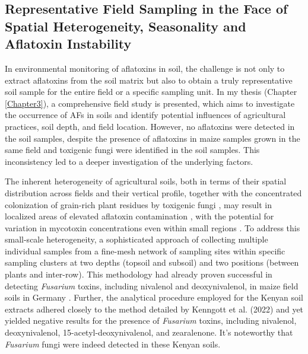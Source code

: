 \subsection{Representative Field Sampling in the Face of Spatial Heterogeneity, Seasonality and Aflatoxin Instability} 

In environmental monitoring of aflatoxins in soil, the challenge is not only to extract aflatoxins from the soil matrix but also to obtain a truly representative soil sample for the entire field or a specific sampling unit. In my thesis (Chapter \ref{Chapter3}), a comprehensive field study is presented, which aims to investigate the occurrence of AFs in soils and identify potential influences of agricultural practices, soil depth, and field location. However, no aflatoxins were detected in the soil samples, despite the presence of aflatoxins in maize samples grown in the same field and toxigenic fungi were identified in the soil samples. This inconsistency led to a deeper investigation of the underlying factors. 


The inherent heterogeneity of agricultural soils, both in terms of their spatial distribution across fields and their vertical profile, together with the concentrated colonization of grain-rich plant residues by toxigenic fungi \citep{horn2003ecology}, may result in localized areas of elevated aflatoxin contamination \citep{accinelli2008aspergillus}, with the potential for variation in mycotoxin concentrations even within small regions \citep{kenngott2022fusarium}. To address this small-scale heterogeneity, a sophisticated approach of collecting multiple individual samples from a fine-mesh network of sampling sites within specific sampling clusters at two depths (topsoil and subsoil) and two positions (between plants and inter-row). This methodology had already proven successful in detecting \textit{Fusarium} toxins, including nivalenol and deoxynivalenol, in maize field soils in Germany \citep{kenngott2022fusarium}. Further, the analytical procedure employed for the Kenyan soil extracts adhered closely to the method detailed by Kenngott et al. (2022) and yet yielded negative results for the presence of \textit{Fusarium} toxins, including nivalenol, deoxynivalenol, 15-acetyl-deoxynivalenol, and zearalenone.  It's noteworthy that \textit{Fusarium} fungi were indeed detected in these Kenyan soils. 


